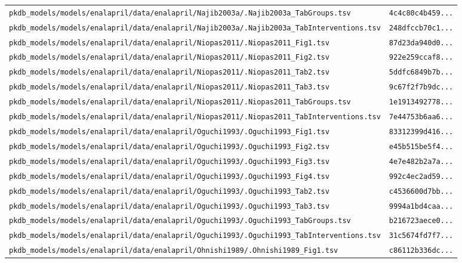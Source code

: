 \begin{longtable}{ll}
\texttt{pkdb\_models/models/enalapril/data/enalapril/Najib2003a/.Najib2003a\_TabGroups.tsv} & \texttt{4c4c80c4b459...} \\
\texttt{pkdb\_models/models/enalapril/data/enalapril/Najib2003a/.Najib2003a\_TabInterventions.tsv} & \texttt{248dfccb70c1...} \\
\texttt{pkdb\_models/models/enalapril/data/enalapril/Niopas2011/.Niopas2011\_Fig1.tsv} & \texttt{87d23da940d0...} \\
\texttt{pkdb\_models/models/enalapril/data/enalapril/Niopas2011/.Niopas2011\_Fig2.tsv} & \texttt{922e259ccaf8...} \\
\texttt{pkdb\_models/models/enalapril/data/enalapril/Niopas2011/.Niopas2011\_Tab2.tsv} & \texttt{5ddfc6849b7b...} \\
\texttt{pkdb\_models/models/enalapril/data/enalapril/Niopas2011/.Niopas2011\_Tab3.tsv} & \texttt{9c67f2f7b9dc...} \\
\texttt{pkdb\_models/models/enalapril/data/enalapril/Niopas2011/.Niopas2011\_TabGroups.tsv} & \texttt{1e1913492778...} \\
\texttt{pkdb\_models/models/enalapril/data/enalapril/Niopas2011/.Niopas2011\_TabInterventions.tsv} & \texttt{7e44753b6aa6...} \\
\texttt{pkdb\_models/models/enalapril/data/enalapril/Oguchi1993/.Oguchi1993\_Fig1.tsv} & \texttt{83312399d416...} \\
\texttt{pkdb\_models/models/enalapril/data/enalapril/Oguchi1993/.Oguchi1993\_Fig2.tsv} & \texttt{e45b515be5f4...} \\
\texttt{pkdb\_models/models/enalapril/data/enalapril/Oguchi1993/.Oguchi1993\_Fig3.tsv} & \texttt{4e7e482b2a7a...} \\
\texttt{pkdb\_models/models/enalapril/data/enalapril/Oguchi1993/.Oguchi1993\_Fig4.tsv} & \texttt{992c4ec2ad59...} \\
\texttt{pkdb\_models/models/enalapril/data/enalapril/Oguchi1993/.Oguchi1993\_Tab2.tsv} & \texttt{c4536600d7bb...} \\
\texttt{pkdb\_models/models/enalapril/data/enalapril/Oguchi1993/.Oguchi1993\_Tab3.tsv} & \texttt{9994a1bd4caa...} \\
\texttt{pkdb\_models/models/enalapril/data/enalapril/Oguchi1993/.Oguchi1993\_TabGroups.tsv} & \texttt{b216723aece0...} \\
\texttt{pkdb\_models/models/enalapril/data/enalapril/Oguchi1993/.Oguchi1993\_TabInterventions.tsv} & \texttt{31c5674fd7f7...} \\
\texttt{pkdb\_models/models/enalapril/data/enalapril/Ohnishi1989/.Ohnishi1989\_Fig1.tsv} & \texttt{c86112b336dc...} \\

\end{longtable}
